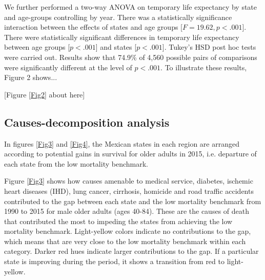 \documentclass{bmcart}
\begin{document}
We further performed a two-way ANOVA on temporary life expectancy by state and age-groups controlling by year. There was a statistically significance interaction between the effects of states and age groups [$F=19.62, p < .001$]. There were statistically significant differences in temporary life expectancy between age groups [$p < .001$] and states [$p < .001$]. Tukey's HSD post hoc tests were carried out. Results show that 74.9\% of 4,560 possible pairs of comparisons were significantly different at the level of $p < .001$. To illustrate these results, Figure 2 shows... \\

\begin{center}
[Figure \ref{Fig2} about here]
\end{center}


\subsection*{Causes-decomposition analysis}


In figures \ref{Fig3} and \ref{Fig4}, the Mexican states in each region are arranged according to potential gains in survival for older adults in 2015, i.e. departure of each state from the low mortality benchmark. 

Figure \ref{Fig3} shows how causes amenable to medical service, diabetes, ischemic heart diseases (IHD), lung cancer, cirrhosis, homicide and road traffic accidents contributed to the gap between each state and the low mortality benchmark from 1990 to 2015 for male older adults (ages 40-84). These are the causes of death that contributed the most to impeding the states from achieving the low mortality benchmark. Light-yellow colors indicate no contributions to the gap, which means that are very close to the low mortality benchmark within each category. Darker red hues indicate larger contributions to the gap. If a particular state is improving during the period, it shows a transition from red to light-yellow. 
\end{document}
